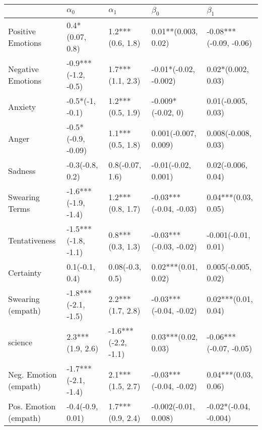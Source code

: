 \begin{tabular}{lllll}
\toprule
{} &           $\alpha_0$ &           $\alpha_1$ &               $\beta_0$ &               $\beta_1$ \\
\midrule
Positive Emotions     &      0.4*(0.07, 0.8) &     1.2***(0.6, 1.8) &     0.01**(0.003, 0.02) &  -0.08***(-0.09, -0.06) \\
Negative Emotions     &  -0.9***(-1.2, -0.5) &     1.7***(1.1, 2.3) &   -0.01*(-0.02, -0.002) &      0.02*(0.002, 0.03) \\
Anxiety               &      -0.5*(-1, -0.1) &     1.2***(0.5, 1.9) &       -0.009*(-0.02, 0) &      0.01(-0.005, 0.03) \\
Anger                 &   -0.5*(-0.9, -0.09) &     1.1***(0.5, 1.8) &    0.001(-0.007, 0.009) &     0.008(-0.008, 0.03) \\
Sadness               &      -0.3(-0.8, 0.2) &      0.8(-0.07, 1.6) &     -0.01(-0.02, 0.001) &      0.02(-0.006, 0.04) \\
Swearing Terms        &  -1.6***(-1.9, -1.4) &     1.2***(0.8, 1.7) &  -0.03***(-0.04, -0.03) &     0.04***(0.03, 0.05) \\
Tentativeness         &  -1.5***(-1.8, -1.1) &     0.8***(0.3, 1.3) &  -0.03***(-0.03, -0.02) &     -0.001(-0.01, 0.01) \\
Certainty             &       0.1(-0.1, 0.4) &      0.08(-0.3, 0.5) &     0.02***(0.01, 0.02) &     0.005(-0.005, 0.02) \\
Swearing (empath)     &  -1.8***(-2.1, -1.5) &     2.2***(1.7, 2.8) &  -0.03***(-0.04, -0.02) &     0.02***(0.01, 0.04) \\
science               &     2.3***(1.9, 2.6) &  -1.6***(-2.2, -1.1) &     0.03***(0.02, 0.03) &  -0.06***(-0.07, -0.05) \\
Neg. Emotion (empath) &  -1.7***(-2.1, -1.4) &     2.1***(1.5, 2.7) &  -0.03***(-0.04, -0.02) &     0.04***(0.03, 0.06) \\
Pos. Emotion (empath) &     -0.4(-0.9, 0.01) &     1.7***(0.9, 2.4) &    -0.002(-0.01, 0.008) &   -0.02*(-0.04, -0.004) \\
\bottomrule
\end{tabular}

